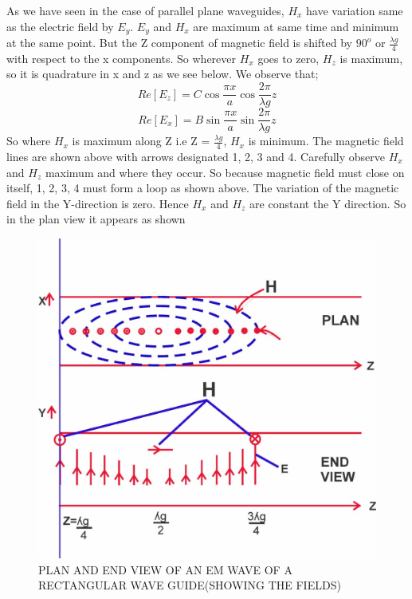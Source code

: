 As we have seen in the case of parallel plane waveguides, $H_{x}$ have variation same as the electric field by $E_{y}$. $E_{y}$ and $H_{x}$ are maximum at same time and minimum at the same point. But the Z component of magnetic field is shifted by $90^{o}$ or $\frac{\lambda g}{4}$ with respect to the x components. So wherever $H_{x}$ goes to zero, $H_{z}$ is maximum, so it is quadrature in x and z as we see below. We observe that;
\begin{equation}
Re[E_{z}] = C\cos\dfrac{\pi x}{a}\cos\dfrac{2\pi}{\lambda g}z
\end{equation}
\begin{equation}
Re[E_{x}] = B\sin\dfrac{\pi x}{a} \sin\dfrac{2\pi}{\lambda g}z
\end{equation}
So where $H_{x}$ is maximum along Z i.e Z = $\frac{\lambda g}{4}$, $H_{x}$ is minimum.
The magnetic field lines are shown above with arrows designated 1, 2, 3 and 4. Carefully observe $H_{x}$ and $H_{z}$ maximum and where they occur. So because magnetic field must close on itself, 1, 2, 3, 4 must form a loop as shown above.
The variation of the magnetic field in the Y-direction is zero. Hence $H_{x}$ and $H_{z}$ are constant the Y direction. So in the plan view it appears as shown 
\begin{figure}[h]
\centering
\includegraphics[width=1\linewidth]{./graphics/image-1.jpg}
\caption{PLAN AND END VIEW OF AN EM WAVE OF A RECTANGULAR WAVE GUIDE(SHOWING THE FIELDS)}
\end{figure}

